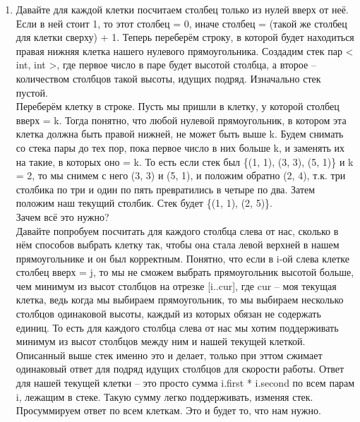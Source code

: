 \documentclass[12pt]{article}
\begin{document}
\begin{enumerate}
	\setlength{\parskip}{0pt} 
	\setlength{\itemsep}{0pt} 
	\item Давайте для каждой клетки посчитаем столбец только из нулей вверх от неё. Если в ней стоит 1, то этот столбец = 0, иначе столбец = (такой же столбец для клетки сверху) + 1. Теперь переберём строку, в которой будет находиться правая нижняя клетка нашего нулевого прямоугольника. Создадим стек пар < int, int >, где первое число в паре будет высотой столбца, а второе -- количеством столбцов такой высоты, идущих подряд. Изначально стек пустой. \\
Переберём клетку в строке. Пусть мы пришли в клетку, у которой столбец вверх = k. Тогда понятно, что любой нулевой прямоугольник, в котором эта клетка должна быть правой нижней, не может быть выше k. Будем снимать со стека пары до тех пор, пока первое число в них больше k, и заменять их на такие, в которых оно = k. То есть если стек был \{(1, 1), (3, 3), (5, 1)\} и k = 2, то мы снимем с него (3, 3) и (5, 1), и положим обратно (2, 4), т.к. три столбика по три и один по пять превратились в четыре по два. Затем положим наш текущий столбик. Стек будет \{(1, 1), (2, 5)\}. \\
Зачем всё это нужно? \\
Давайте попробуем посчитать для каждого столбца слева от нас, сколько в нём способов выбрать клетку так, чтобы она стала левой верхней в нашем прямоугольнике и он был корректным. Понятно, что если в i-ой слева клетке столбец вверх = j, то мы не сможем выбрать прямоугольник высотой больше, чем минимум из высот столбцов на отрезке [i..cur], где cur -- моя текущая клетка, ведь когда мы выбираем прямоугольник, то мы выбираем несколько столбцов одинаковой высоты, каждый из которых обязан не содержать единиц. То есть для каждого столбца слева от нас мы хотим поддерживать минимум из высот столбцов между ним и нашей текущей клеткой. Описанный выше стек именно это и делает, только при эттом сжимает одинаковый ответ для подряд идущих столбцов для скорости работы. Ответ для нашей текущей клетки -- это просто сумма i.first * i.second по всем парам i, лежащим в стеке. Такую сумму легко поддерживать, изменяя стек. \\
Просуммируем ответ по всем клеткам. Это и будет то, что нам нужно.
\end{enumerate}
\end{document}
